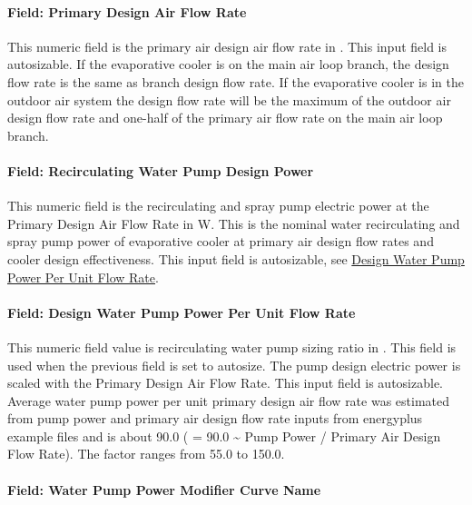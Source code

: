\paragraph{Field: Primary Design Air Flow Rate}\label{field-primary-design-air-flow-rate}

This numeric field is the primary air design air flow rate in \si{\volumeFlowRate}. This input field is autosizable. If the evaporative cooler is on the main air loop branch, the design flow rate is the same as branch design flow rate. If the evaporative cooler is in the outdoor air system the design flow rate will be the maximum of the outdoor air design flow rate and one-half of the primary air flow rate on the main air loop branch.

\paragraph{Field: Recirculating Water Pump Design Power}

This numeric field is the recirculating and spray pump electric power at the Primary Design Air Flow Rate in \si{\watt}.
This is the nominal water recirculating and spray pump power of evaporative cooler at primary air design flow rates and cooler design effectiveness.
This input field is autosizable, see \hyperref[field-design-water-pump-power-per-unit-flow-rate]{Design Water Pump Power Per Unit Flow Rate}.

\paragraph{Field: Design Water Pump Power Per Unit Flow Rate}\label{field-design-water-pump-power-per-unit-flow-rate}

This numeric field value is recirculating water pump sizing ratio in \si{\wattperVolumeFlowRate}.
This field is used when the previous field is set to autosize. The pump design electric power is scaled with the Primary Design Air Flow Rate. This input field is autosizable.
Average water pump power per unit primary design air flow rate was estimated from pump power and primary air design flow rate inputs from energyplus example files and
is about \SI{90.0}{\wattperVolumeFlowRate} ( = 90.0 \textasciitilde{} Pump Power / Primary Air Design Flow Rate). The factor ranges from 55.0 to \SI{150.0}{\wattperVolumeFlowRate}.

\paragraph{Field: Water Pump Power Modifier Curve Name}\label{field-water-pump-power-modifier-curve-name}

